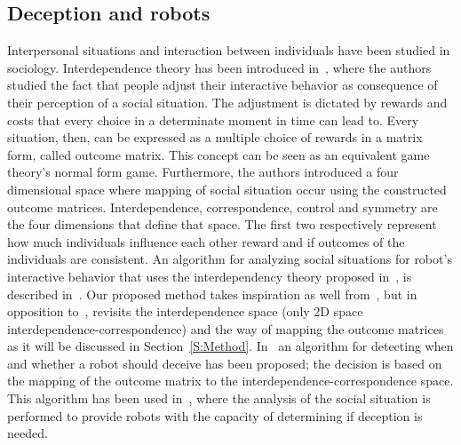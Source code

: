 \subsection{Deception and robots}
Interpersonal situations and interaction between individuals have been studied in sociology. Interdependence theory has been introduced in~\cite{kelley_interpersonal_1978}, where the authors studied the fact that people adjust their interactive behavior as consequence of their perception of a social situation. The adjustment is dictated by rewards and costs that every choice in a determinate moment in time can lead to. Every situation, then, can be expressed as a multiple choice of rewards in a matrix form, called outcome matrix. This concept can be seen as an equivalent game theory's normal form game. Furthermore, the authors introduced a four dimensional space where mapping of social situation occur using the constructed outcome matrices. Interdependence, correspondence, control and symmetry are the four dimensions that define that space. The first two respectively represent how much individuals influence each other reward and if outcomes of the individuals are consistent. 
An algorithm for analyzing social situations for robot's interactive behavior that uses the interdependency theory proposed in~\cite{kelley_interpersonal_1978}, is described in~\cite{wagner_analyzing_2008}. Our proposed method takes inspiration as well from~\cite{kelley_interpersonal_1978}, but in opposition to~\cite{wagner_analyzing_2008}, revisits the interdependence space (only 2D space interdependence-correspondence) and the way of mapping the outcome matrices as it will be discussed in Section~\ref{S:Method}.
In~\cite{wagner_robot_2009} an algorithm for detecting when and whether a robot should deceive has been proposed; the decision is based on the mapping of the outcome matrix to the interdependence-correspondence space. This algorithm has been used in~\cite{wagner_acting_2011}, where the analysis of the social situation is performed to provide robots with the capacity of determining if deception is needed. 

